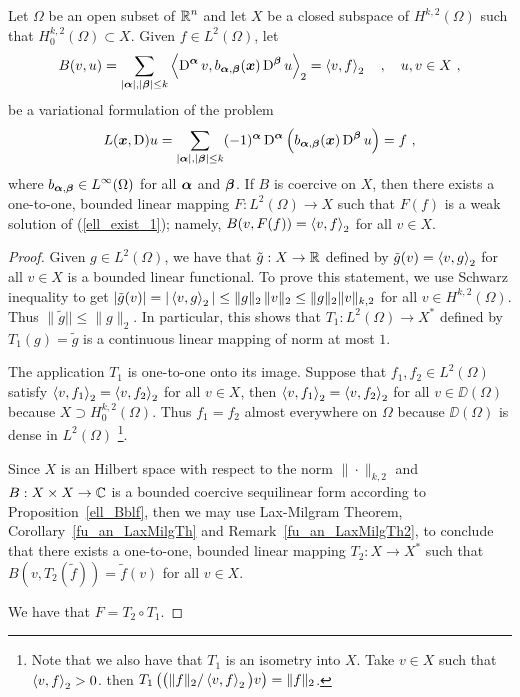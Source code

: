 \begin{theorem} \label{ell_exist_th1}
Let $\Omega$ be an open subset of $\displaystyle \mathbb{R}^n$ and let $X$ be a closed
subspace of $\displaystyle H^{k,2}(\Omega)$ such that
$\displaystyle H^{k,2}_0(\Omega) \subset X$.
Given $\displaystyle f \in L^2(\Omega)$, let
\begin{equation} \label{ell_exist_1}
B(v,u) = \sum_{|\VEC{\alpha}|,|\VEC{\beta}|\leq k}
\ps{\diff^{\VEC{\alpha}} v}{b_{\VEC{\alpha},\VEC{\beta}}(\VEC{x})
\diff^{\VEC{\beta}} u}_2 = \ps{v}{f}_2 \quad , \quad u,v \in X \ ,
\end{equation}
be a variational formulation of the problem
\begin{equation} \label{ell_exist_2}
L({\bm{x}},\operatorname{D})u = \sum_{|{\bm{\alpha}}|,|{\bm{\beta}}|\leq k}
(-1)^{{\bm{\alpha}}} \operatorname{D}^{{\bm{\alpha}}}
\left( b_{{\bm{\alpha}},{\bm{\beta}}}({\bm{x}}) \operatorname{D}^{{\bm{\beta}}} u\right) = f \  ,
\end{equation}
where $\displaystyle b_{{\bm{\alpha}},{\bm{\beta}}} \in L^\infty(\Omega)$ for all
${\bm{\alpha}}$ and ${\bm{\beta}}$.
If $B$ is coercive on $X$, then there exists a one-to-one, bounded
linear mapping $F:L^2(\Omega) \rightarrow X$ such that $F(f)$ is a
weak solution of (\ref{ell_exist_1}); namely,
$\displaystyle B(v,F(f)) = \left\langle{v} , {f}\right\rangle_2$ for all $\displaystyle v \in X$.
\end{theorem}

\begin{proof}
Given $\displaystyle g \in L^2(\Omega)$, we have that
$\tilde{g}:X \to \mathbb{R}$ defined by
$\tilde{g}(v) = \left\langle{v} , {g}\right\rangle_2$ for all $v \in X$ is a bounded linear
functional.  To prove this statement, we use Schwarz inequality to get
$\displaystyle |\tilde{g}(v)| =|\left\langle{v} , {g}\right\rangle_2|
\leq \|g\|_2 \, \|v\|_2 \leq \|g\|_2 \|v\|_{k,2}$
for all $\displaystyle v \in H^{k,2}(\Omega)$.  Thus 
$\|\tilde{g}|| \leq \|g\|_2$.  In particular, this shows that
$\displaystyle T_1:L^2(\Omega) \to X^\ast$ defined by
$T_1(g) = \tilde{g}$ is a continuous linear mapping of norm at most $1$. 

The application $T_1$ is one-to-one onto its image.  Suppose that
$\displaystyle f_1, f_2 \in L^2(\Omega)$ satisfy
$\left\langle{v} , {f_1}\right\rangle_2 = \left\langle{v} , {f_2}\right\rangle_2$ for all $v\in X$, then 
$\left\langle{v} , {f_1}\right\rangle_2 = \left\langle{v} , {f_2}\right\rangle_2$ for all $v\in \DD(\Omega)$ because
$\displaystyle X\supset H^{k,2}_0(\Omega)$.  Thus $f_1=f_2$ almost
everywhere on $\Omega$ because $\DD(\Omega)$ is dense in
$L^2(\Omega)$ \footnote{Note that we also have that $T_1$ is an
isometry into $X$.  Take $v \in X$ such that $\left\langle{v} , {f}\right\rangle_2>0$. then
$\displaystyle T_1\left(\big(\|f\|_2 / \left\langle{v} , {f}\right\rangle_2\big) v\right) = \|f\|_2$.}.

Since $X$ is an Hilbert space with respect to the norm
$\|\cdot\|_{k,2}$ and $B:X\times X \rightarrow \mathbb{C}$ is a bounded
coercive sequilinear form according to Proposition~\ref{ell_Bblf}, then we may
use Lax-Milgram Theorem, Corollary~\ref{fu_an_LaxMilgTh}
and Remark~\ref{fu_an_LaxMilgTh2}, to conclude that there exists a
one-to-one, bounded linear mapping $T_2:X \rightarrow X^\ast$ such that
$\displaystyle B(v,T_2(\tilde{f})) = \tilde{f}(v)$ for all $v \in X$.

We have that $F = T_2 \circ T_1$.
\end{proof}

